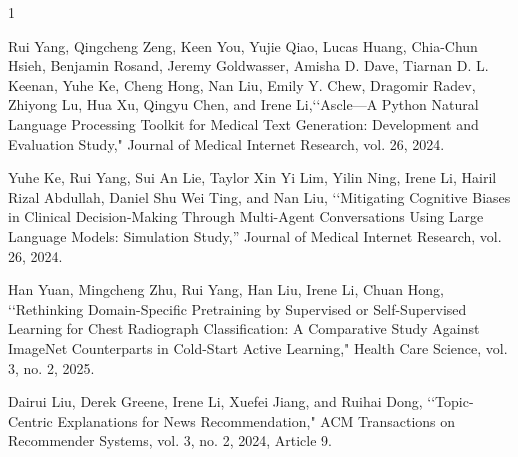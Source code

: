 





\begin{雑誌論文}{1}  %


Rui Yang, Qingcheng Zeng, Keen You, Yujie Qiao, Lucas Huang, Chia-Chun Hsieh, Benjamin Rosand, Jeremy Goldwasser, Amisha D. Dave, Tiarnan D. L. Keenan, Yuhe Ke, Cheng Hong, Nan Liu, Emily Y. Chew, Dragomir Radev, Zhiyong Lu, Hua Xu, Qingyu Chen, and Irene Li,\lq\lq Ascle—A Python Natural Language Processing Toolkit for Medical Text Generation: Development and Evaluation Study," Journal of Medical Internet Research, vol. 26, 2024.


Yuhe Ke, Rui Yang, Sui An Lie, Taylor Xin Yi Lim, Yilin Ning, Irene Li, Hairil Rizal Abdullah, Daniel Shu Wei Ting, and Nan Liu, \lq\lq Mitigating Cognitive Biases in Clinical Decision-Making Through Multi-Agent Conversations Using Large Language Models: Simulation Study,” Journal of Medical Internet Research, vol. 26, 2024.

Han Yuan, Mingcheng Zhu, Rui Yang, Han Liu, Irene Li, Chuan Hong, \lq\lq Rethinking Domain-Specific Pretraining by Supervised or Self-Supervised Learning for Chest Radiograph Classification: A Comparative Study Against ImageNet Counterparts in Cold-Start Active Learning," Health Care Science, vol. 3, no. 2, 2025.

Dairui Liu, Derek Greene, Irene Li, Xuefei Jiang, and Ruihai Dong, \lq\lq Topic-Centric Explanations for News Recommendation," ACM Transactions on Recommender Systems, vol. 3, no. 2, 2024, Article 9.

\end{雑誌論文}  %


